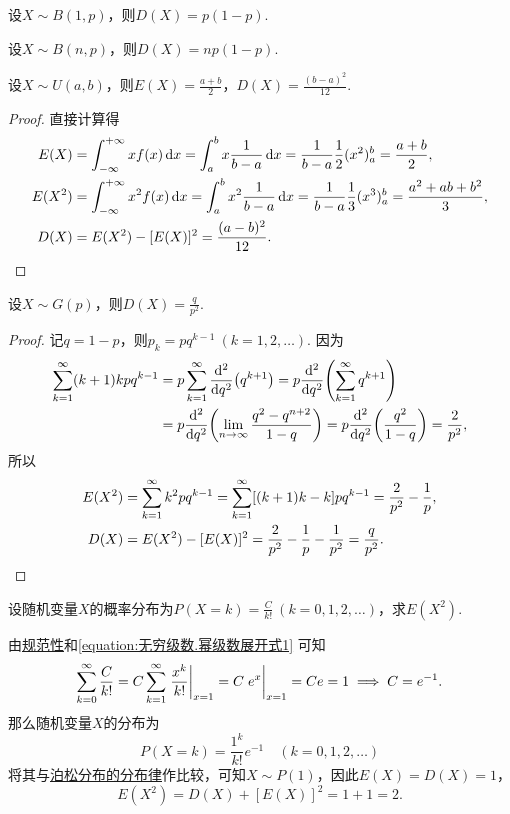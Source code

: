 \begin{theorem}
设\(X \sim B(1,p)\)，则\(D(X) = p(1-p)\).
\end{theorem}

\begin{theorem}
设\(X \sim B(n,p)\)，则\(D(X) = np(1-p)\).
\end{theorem}

\begin{theorem}
设\(X \sim U(a,b)\)，则\(E(X) = \frac{a+b}{2}\)，\(D(X) = \frac{(b-a)^2}{12}\).
\begin{proof}
直接计算得
\begin{align*}
E(X) &= \int_{-\infty}^{+\infty} x f(x) \dd{x}
= \int_a^b x \frac{1}{b-a} \dd{x}
= \frac{1}{b-a} \frac{1}{2} (x^2)_a^b
= \frac{a+b}{2}, \\
E(X^2) &= \int_{-\infty}^{+\infty} x^2 f(x) \dd{x}
= \int_a^b x^2 \frac{1}{b-a} \dd{x}
= \frac{1}{b-a} \frac{1}{3} (x^3)_a^b
= \frac{a^2+ab+b^2}{3}, \\
D(X) &= E(X^2) - [E(X)]^2
= \frac{(a-b)^2}{12}.
\qedhere
\end{align*}
\end{proof}
\end{theorem}

\begin{theorem}\label{theorem:随机变量的数字特征.几何分布的方差}
设\(X \sim G(p)\)，则\(D(X) = \frac{q}{p^2}\).
\begin{proof}
记\(q = 1-p\)，则\(p_k = pq^{k-1}\ (k=1,2,\dotsc)\).
因为\begin{align*}
	\sum\limits_{k=1}^\infty (k+1)kpq^{k-1}
	&= p \sum\limits_{k=1}^\infty \dv[2]{q}(q^{k+1})
	= p \dv[2]{q}(\sum\limits_{k=1}^\infty q^{k+1}) \\
	&= p \dv[2]{q}(\lim\limits_{n\to\infty} \frac{q^2-q^{n+2}}{1-q})
	= p \dv[2]{q}(\frac{q^2}{1-q})
	= \frac{2}{p^2}, \\
\end{align*}
所以\begin{align*}
	E(X^2) &= \sum\limits_{k=1}^\infty k^2 pq^{k-1}
	= \sum\limits_{k=1}^\infty [(k+1)k-k] pq^{k-1}
	= \frac{2}{p^2} - \frac{1}{p}, \\
	D(X) &= E(X^2) - [E(X)]^2
	= \frac{2}{p^2} - \frac{1}{p} - \frac{1}{p^2}
	= \frac{q}{p^2}.
	\qedhere
\end{align*}
\end{proof}
\end{theorem}

\begin{example}
设随机变量\(X\)的概率分布为\(P(X=k) = \frac{C}{k!}\ (k=0,1,2,\dotsc)\)，求\(E(X^2)\).
\begin{solution}
由\hyperref[theorem:随机变量及其分布.离散型随机变量的密度函数的性质]{规范性}和\cref{equation:无穷级数.幂级数展开式1} 可知\[
\sum\limits_{k=0}^\infty \frac{C}{k!}
= C \sum\limits_{k=1}^\infty \eval{\frac{x^k}{k!}}_{x=1}
= C \eval{e^x}_{x=1}
= C e = 1
\implies
C = e^{-1}.
\]那么随机变量\(X\)的分布为\[
P(X=k) = \frac{1^k}{k!} e^{-1} \quad(k=0,1,2,\dotsc)
\]将其与\hyperref[equation:随机变量及其分布.泊松分布的分布律]{泊松分布的分布律}作比较，可知\(X \sim P(1)\)，因此\(E(X) = D(X) = 1\)，\[
E(X^2) = D(X) + [E(X)]^2 = 1 + 1 = 2.
\]
\end{solution}
\end{example}

